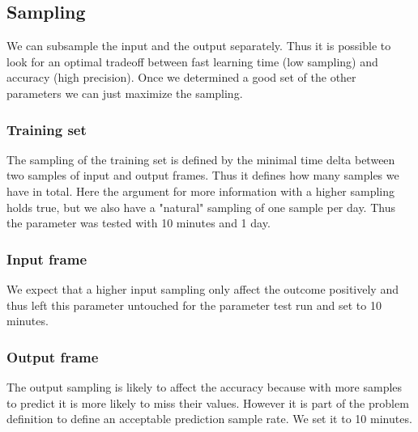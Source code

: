 \documentclass{scrartcl}
\begin{document}
\subsection{Sampling}
\label{sec:}
We can subsample the input and the output separately. Thus it is possible to look for an optimal tradeoff between fast learning time (low sampling) and accuracy (high precision). Once we determined a good set of the other parameters we can just maximize the sampling.

\subsubsection{Training set}
\label{sec:}
The sampling of the training set is defined by the minimal time delta between two samples of input and output frames. Thus it defines how many samples we have in total. Here the argument for more information with a higher sampling holds true, but we also have a "natural" sampling of one sample per day. Thus the parameter was tested with 10 minutes and 1 day.

\subsubsection{Input frame}
\label{sec:}
We expect that a higher input sampling only affect the outcome positively and thus left this parameter untouched for the parameter test run and set to 10 minutes.

\subsubsection{Output frame}
\label{sec:}
The output sampling is likely to affect the accuracy because with more samples to predict it is more likely to miss their values. However it is part of the problem definition to define an acceptable prediction sample rate. We set it to 10 minutes.
\end{document}
